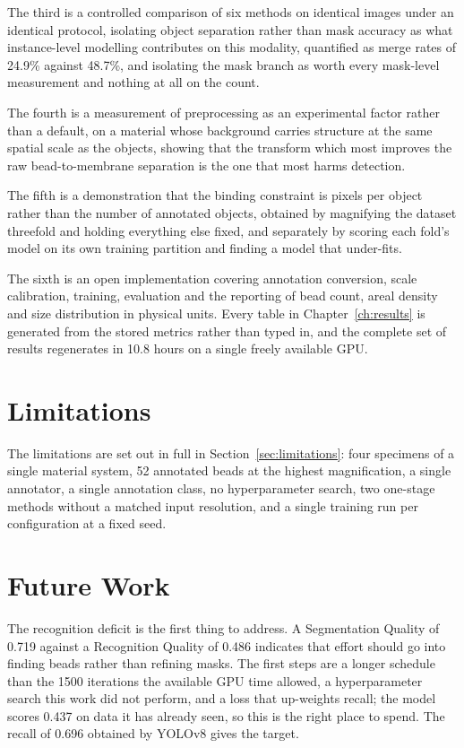 The third is a controlled comparison of six methods on identical images under an
identical protocol, isolating object separation rather than mask accuracy as what
instance-level modelling contributes on this modality, quantified as merge rates
of 24.9\% against 48.7\%, and isolating the mask branch as worth
every mask-level measurement and nothing at all on the count.

The fourth is a measurement of preprocessing as an experimental factor rather than
a default, on a material whose background carries structure at the same spatial
scale as the objects, showing that the transform which most improves the raw
bead-to-membrane separation is the one that most harms detection.

The fifth is a demonstration that the binding constraint is pixels per object
rather than the number of annotated objects, obtained by magnifying the dataset
threefold and holding everything else fixed, and separately by scoring each fold's
model on its own training partition and finding a model that under-fits.

The sixth is an open implementation covering annotation conversion, scale
calibration, training, evaluation and the reporting of bead count, areal density
and size distribution in physical units. Every table in
Chapter~\ref{ch:results} is generated from the stored metrics rather than typed
in, and the complete set of results regenerates in 10.8 hours on a single freely
available GPU.

\section{Limitations}

The limitations are set out in full in Section~\ref{sec:limitations}: four specimens of a single material system, 52 annotated beads at the highest magnification, a single annotator, a single annotation class, no hyperparameter search, two one-stage methods without a matched input resolution, and a single training run per configuration at a fixed seed.

\section{Future Work}
\label{sec:futurework}

The recognition deficit is the first thing to address. A Segmentation Quality of 0.719
against a Recognition Quality of 0.486 indicates that effort should go into
finding beads rather than refining masks. The first steps are a longer schedule
than the 1500 iterations the available GPU time allowed, a hyperparameter search
this work did not perform, and a loss that up-weights recall; the model scores
0.437 on data it has already seen, so this is the right place to spend. The recall
of 0.696 obtained by YOLOv8 gives the target.

